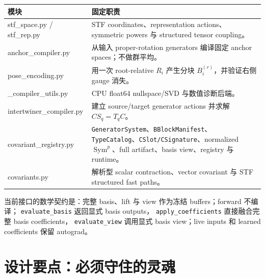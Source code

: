 \documentclass[11pt,a4paper,fontset=fandol]{ctexart}
\newcommand{\Sym}{\operatorname{Sym}}
\begin{document}
\begin{center}
\small
\begin{tabularx}{\linewidth}{>{\ttfamily\raggedright\arraybackslash}p{.34\linewidth}X}
\toprule
模块 & 固定职责 \\
\midrule
stf\_space.py / stf\_rep.py
& STF coordinates、representation actions、symmetric powers 与 structured tensor coupling。\\
anchor\_compiler.py
& 从输入 proper-rotation generators 编译固定 anchor spaces；不做群平均。\\
pose\_encoding.py
& 用一次 root-relative $R_i$ 产生分块 $B_i^{(r)}$，并验证右侧 gauge 消失。\\
\_compiler\_utils.py
& CPU float64 nullspace/SVD 与数值诊断后端。\\
intertwiner\_compiler.py
& 建立 source/target generator actions 并求解 $CS_q=T_qC$。\\
covariant\_registry.py
& \texttt{GeneratorSystem}、\texttt{BBlockManifest}、\texttt{TypeCatalog}、\texttt{CSlot/CSignature}、normalized $\Sym^p$、full artifact、basis view、registry 与 runtime。\\
covariants.py
& 解析型 scalar contraction、vector covariant 与 STF structured fast paths。\\
\bottomrule
\end{tabularx}
\end{center}

当前接口的数学契约是：完整 basis、lift 与 view 作为冻结 buffers；forward 不编译；
\texttt{evaluate\_basis} 返回显式 basis outputs，
\texttt{apply\_coefficients} 直接融合完整 basis coefficients，
\texttt{evaluate\_view} 调用显式 basis view；live inputs 和 learned coefficients 保留 autograd。

\section{设计要点：必须守住的灵魂}
\end{document}

